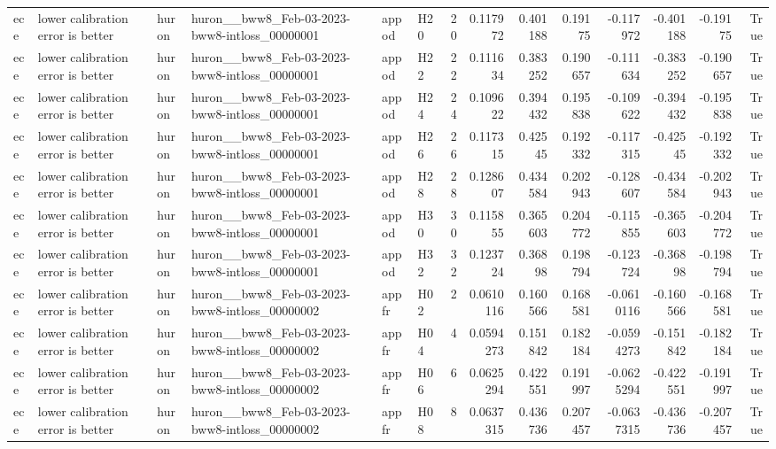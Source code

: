 \begin{longtable}{llllllrrrrrrrr}
ece & lower calibration error is better & huron & huron\_\_bww8\_Feb-03-2023-bww8-intloss\_00000001 & appod & H20 & 20 & 0.117972 & 0.401188 & 0.19175 & -0.117972 & -0.401188 & -0.19175 & True \\
ece & lower calibration error is better & huron & huron\_\_bww8\_Feb-03-2023-bww8-intloss\_00000001 & appod & H22 & 22 & 0.111634 & 0.383252 & 0.190657 & -0.111634 & -0.383252 & -0.190657 & True \\
ece & lower calibration error is better & huron & huron\_\_bww8\_Feb-03-2023-bww8-intloss\_00000001 & appod & H24 & 24 & 0.109622 & 0.394432 & 0.195838 & -0.109622 & -0.394432 & -0.195838 & True \\
ece & lower calibration error is better & huron & huron\_\_bww8\_Feb-03-2023-bww8-intloss\_00000001 & appod & H26 & 26 & 0.117315 & 0.42545 & 0.192332 & -0.117315 & -0.42545 & -0.192332 & True \\
ece & lower calibration error is better & huron & huron\_\_bww8\_Feb-03-2023-bww8-intloss\_00000001 & appod & H28 & 28 & 0.128607 & 0.434584 & 0.202943 & -0.128607 & -0.434584 & -0.202943 & True \\
ece & lower calibration error is better & huron & huron\_\_bww8\_Feb-03-2023-bww8-intloss\_00000001 & appod & H30 & 30 & 0.115855 & 0.365603 & 0.204772 & -0.115855 & -0.365603 & -0.204772 & True \\
ece & lower calibration error is better & huron & huron\_\_bww8\_Feb-03-2023-bww8-intloss\_00000001 & appod & H32 & 32 & 0.123724 & 0.36898 & 0.198794 & -0.123724 & -0.36898 & -0.198794 & True \\
ece & lower calibration error is better & huron & huron\_\_bww8\_Feb-03-2023-bww8-intloss\_00000002 & appfr & H02 & 2 & 0.0610116 & 0.160566 & 0.168581 & -0.0610116 & -0.160566 & -0.168581 & True \\
ece & lower calibration error is better & huron & huron\_\_bww8\_Feb-03-2023-bww8-intloss\_00000002 & appfr & H04 & 4 & 0.0594273 & 0.151842 & 0.182184 & -0.0594273 & -0.151842 & -0.182184 & True \\
ece & lower calibration error is better & huron & huron\_\_bww8\_Feb-03-2023-bww8-intloss\_00000002 & appfr & H06 & 6 & 0.0625294 & 0.422551 & 0.191997 & -0.0625294 & -0.422551 & -0.191997 & True \\
ece & lower calibration error is better & huron & huron\_\_bww8\_Feb-03-2023-bww8-intloss\_00000002 & appfr & H08 & 8 & 0.0637315 & 0.436736 & 0.207457 & -0.0637315 & -0.436736 & -0.207457 & True \\

\end{longtable}
